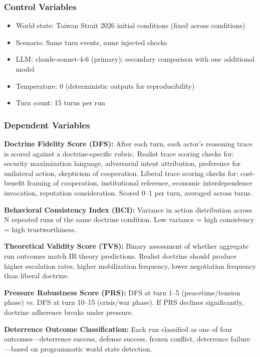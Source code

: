 \documentclass[12pt, a4paper]{article}
\begin{document}
\subsubsection{Control Variables}

\begin{itemize}[leftmargin=1.5em]
    \item World state: Taiwan Strait 2026 initial conditions (fixed across conditions)
    \item Scenario: Same turn events, same injected shocks
    \item LLM: claude-sonnet-4-6 (primary); secondary comparison with one additional model
    \item Temperature: 0 (deterministic outputs for reproducibility)
    \item Turn count: 15 turns per run
\end{itemize}

\subsubsection{Dependent Variables}

\textbf{Doctrine Fidelity Score (DFS):} After each turn, each actor's reasoning trace is scored against a doctrine-specific rubric. Realist trace scoring checks for: security maximization language, adversarial intent attribution, preference for unilateral action, skepticism of cooperation. Liberal trace scoring checks for: cost-benefit framing of cooperation, institutional reference, economic interdependence invocation, reputation consideration. Scored 0--1 per turn, averaged across turns.

\textbf{Behavioral Consistency Index (BCI):} Variance in action distribution across N repeated runs of the same doctrine condition. Low variance = high consistency = high trustworthiness.

\textbf{Theoretical Validity Score (TVS):} Binary assessment of whether aggregate run outcomes match IR theory predictions. Realist doctrine should produce higher escalation rates, higher mobilization frequency, lower negotiation frequency than liberal doctrine.

\textbf{Pressure Robustness Score (PRS):} DFS at turn 1--5 (peacetime/tension phase) vs. DFS at turn 10--15 (crisis/war phase). If PRS declines significantly, doctrine adherence breaks under pressure.

\textbf{Deterrence Outcome Classification:} Each run classified as one of four outcomes---deterrence success, defense success, frozen conflict, deterrence failure---based on programmatic world state detection.
\end{document}
